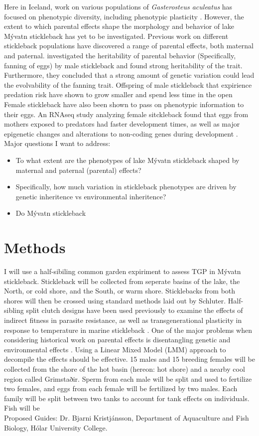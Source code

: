 \documentclass[12pt]{extarticle}
\begin{document}
Here in Iceland, work on various populations of \textit{Gasterosteus aculeatus} has focused on phenotypic diversity, including phenotypic plasticity \citep{Kristjansson2002, Millet2013}. However, the extent to which parental effects shape the morphology and behavior of lake M\'yvatn stickleback has yet to be investigated. Previous work on different stickleback populations have discovered a range of parental effects, both maternal and paternal. \citet{Bell2018} investigated the heritability of parental behavior (Specifically, fanning of eggs) by male stickleback and found strong heritability of the trait. Furthermore, they concluded that a strong amount of genetic variation could lead the evolvability of the fanning trait. Offspring of male stickleback that expirience predation risk have shown to grow smaller and spend less time in the open \citep{Bell2016, Stein2014} Female stickleback have also been shown to pass on phenotypic information to their eggs. An RNAseq study analyzing female sitckleback found that eggs from mothers exposed to predators had faster development times, as well as major epigenetic changes and alterations to non-coding genes during development \citep{Mommer2014, Bell2016}.  \\


Major questions I want to address:
\begin{itemize}
 \item To what extent are the phenotypes of lake M\'yvatn stickleback 
shaped by maternal and paternal (parental) effects?
 \item Specifically, how much variation in stickleback phenotypes are driven by genetic inheritence vs environmental inheritence?
 \item Do M\'yvatn stickleback 
\end{itemize}


\section*{Methods}
I will use a half-sibiling common garden expiriment to assess TGP in M\'yvatn stickleback. Stickleback will be collected from seperate basins of the lake, the North, or cold shore, and the South, or warm shore. Sticklebacks from both shores will then be crossed using standard methods laid out by Schluter. Half-sibling split clutch designs have been used previously to examine the effects of indirect fitness in parasite resistance, as well as transgenerational plasticity in response to temperature in marine stickleback \citep{Barber2001,Ramler2014}. One of the major problems when considering historical work on parental effects is disentangling genetic and environmental effects \citep{Donelson2018}. Using a Linear Mixed Model (LMM) approach to decompile the effects should be effective.
15 males and 15 breeding females will be collected from the shore of the hot basin (hereon: hot shore) and a nearby cool region called Grimstaðir. Sperm from each male will be split and used to fertilize two females, and eggs from each female will be fertilized by two males. Each family will be split between two tanks to account for tank effects on individuals. Fish will be
\\

Proposed Guides: Dr. Bjarni Kristj\'ansson, Department of Aquaculture and Fish Biology, H\'olar University College.

\end{document}
